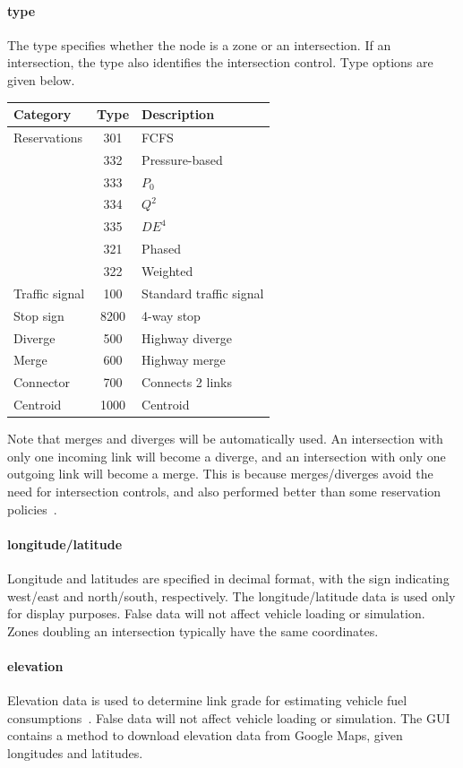 \paragraph*{type}
The type specifies whether the node is a zone or an intersection. If an intersection, the type also identifies the intersection control. Type options are given below.
\begin{center}
\begin{tabular}{lcl}
\hline
Category & Type & Description\\\hline
Reservations & 301 & FCFS\\
& 332 & Pressure-based\\
& 333 & $P_0$\\
& 334 & $Q^2$~\cite{levin2015optimizing}\\
& 335 & $DE^4$~\cite{levin2015optimizing}\\
& 321 & {\sc Phased}\\
& 322 & {\sc Weighted}\\\hline
Traffic signal & 100 & Standard traffic signal\\
Stop sign & 8200 & 4-way stop \\\hline
Diverge & 500 & Highway diverge\\
Merge & 600 & Highway merge\\
Connector & 700 & Connects 2 links\\\hline
Centroid & 1000 & Centroid\\\hline
\end{tabular}
\end{center}
Note that merges and diverges will be automatically used. An intersection with only one incoming link will become a diverge, and an intersection with only one outgoing link will become a merge. This is because merges/diverges avoid the need for intersection controls, and also performed better than some reservation policies~\cite{levin2016paradoxes}.

\paragraph*{longitude/latitude}
Longitude and latitudes are specified in decimal format, with the sign indicating west/east and north/south, respectively. The longitude/latitude data is used only for display purposes. False data will not affect vehicle loading or simulation. Zones doubling an intersection typically have the same coordinates.

\paragraph*{elevation}
Elevation data is used to determine link grade for estimating vehicle fuel consumptions~\cite{levin2014effect}. False data will not affect vehicle loading or simulation. The GUI contains a method to download elevation data from Google Maps, given longitudes and latitudes.


